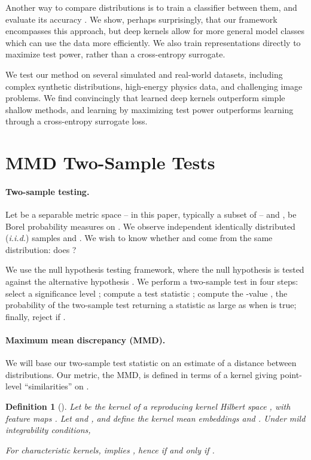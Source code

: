 \documentclass{article}
\newtheorem{definition}[theorem]{Definition} \crefname{definition}{Definition}{Definitions}
\begin{document}
Another way to compare distributions is to train a classifier between them, and evaluate its accuracy \citep{Lopez:C2ST}.
We show, perhaps surprisingly, that our framework encompasses this approach,
but deep kernels allow for more general model classes which can use the data more efficiently.
We also train representations
directly to maximize test power,
rather than a cross-entropy surrogate.

We test our method on several simulated and real-world datasets,
including complex synthetic distributions,
high-energy physics data,
and challenging image problems.
We find convincingly that learned deep kernels outperform simple shallow methods,
and learning by maximizing test power
outperforms learning through a cross-entropy surrogate loss.







\section{MMD Two-Sample Tests}\label{sec:background}
\paragraph{Two-sample testing.}
Let  be a separable metric space
-- in this paper, typically a subset of  --
and ,  be Borel probability measures on .
We observe independent identically distributed (\emph{i.i.d.}) samples  and .
We wish to know whether  and  come from the same distribution:
does ?

We use the null hypothesis testing framework,
where  the null hypothesis  is tested against the alternative hypothesis .
We perform a two-sample test in four steps:
select a significance level ;
compute a test statistic ;
compute the -value , the probability of the two-sample test returning a statistic as large as  when  is true;
finally, reject  if .

\paragraph{Maximum mean discrepancy (MMD).}
We will base our two-sample test statistic
on an estimate of a distance between distributions.
Our metric, the MMD,
is defined in terms of a kernel 
giving point-level ``similarities'' on .


\begin{definition}[\citealp{Gretton2012}]
Let 
be the kernel
of a reproducing kernel Hilbert space ,
with feature maps .
Let  and ,
and define the \emph{kernel mean embeddings}
 and .
Under mild integrability conditions,

For \emph{characteristic} kernels,
 implies ,
hence  if and only if .
\end{definition}
\end{document}
